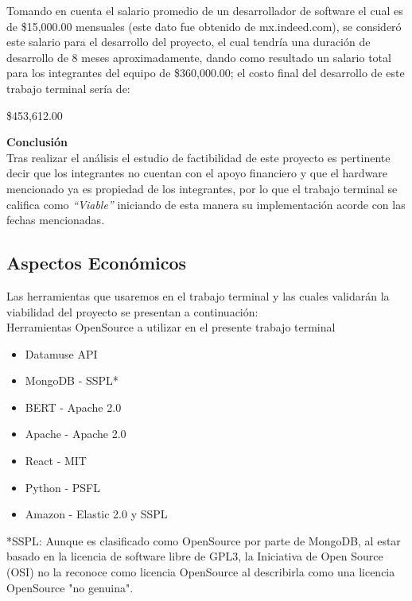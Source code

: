 \documentclass[12pt, a4paper, titlepage]{report}
\begin{document}
    	Tomando en cuenta el salario promedio de un desarrollador de software el cual es de \$15,000.00 mensuales (este dato fue obtenido de mx.indeed.com), se consideró este salario para el desarrollo del proyecto, el cual tendría una duración de desarrollo de 8 meses aproximadamente, dando como resultado un salario total para los integrantes del equipo de \$360,000.00; el costo final del desarrollo de este trabajo terminal sería de: \\
    	\begin{center}
    		\$453,612.00
    	\end{center}
    	\textbf{Conclusión\\} 
    	Tras realizar el análisis el estudio de factibilidad de este proyecto es pertinente decir que los integrantes no cuentan con el apoyo financiero y que el hardware mencionado ya es propiedad de los integrantes, por lo que el trabajo terminal se califica como \textit{“Viable”} iniciando de esta manera su implementación acorde con las fechas mencionadas.
    	
    	\subsection{Aspectos Econ\'omicos}
    	Las herramientas que usaremos en el trabajo terminal y las cuales validarán la viabilidad del proyecto se presentan a continuación:\\
    	
    	Herramientas OpenSource a utilizar en el presente trabajo terminal
    	
    	\begin{itemize}
    		\item Datamuse API \cite{refDatamuseLicense}
    		\item MongoDB - SSPL* \cite{refMongoDBLicense}
    		\item BERT - Apache 2.0 \cite{refBERTLicense}
    		\item Apache - Apache 2.0 \cite{refApacheLicense}
    		\item React - MIT \cite{refReactLicense}
    		\item Python - PSFL \cite{refPythonLicense}
    		\item Amazon - Elastic 2.0 y SSPL \cite{refAmazonLicense}
    	\end{itemize}
    	
    	*SSPL: Aunque es clasificado como OpenSource por parte de MongoDB, al estar basado en la licencia de software libre de GPL3, la Iniciativa de Open Source (OSI) no la reconoce como licencia OpenSource al describirla como una licencia OpenSource "no genuina".\\
    	
\end{document}
